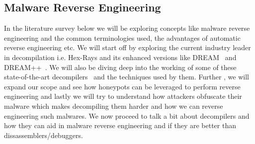 \documentclass[11pt]{article}
\begin{document}
	\subsection{Malware Reverse Engineering}
	In the literature survey below we will be exploring concepts like malware reverse engineering and the common terminologies used, the advantages of automatic reverse engineering etc. We will start off by exploring the current industry leader in decompilation i.e. Hex-Rays and its enhanced versions like DREAM~\cite{yakdan2015no} and DREAM++~\cite{yakdan2016helping}. We will also be diving deep into the working of some of these state-of-the-art decompilers~\cite{guilfanov2008decompilers} and the techniques used by them. Further , we will expand our scope and see how honeypots can be leveraged to perform reverse engineering and lastly we will try to understand how attackers obfuscate their malware which makes decompiling them harder and how we can reverse engineering such malwares. We now proceed to talk a bit about decompilers and how they can aid in malware reverse engineering and if they are better than dissassemblers/debuggers.\\ \\
	
\end{document}
